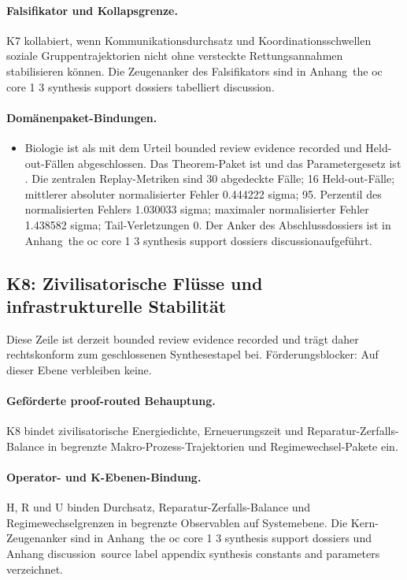 \paragraph{Falsifikator und Kollapsgrenze.}
K7 kollabiert, wenn Kommunikationsdurchsatz und Koordinationsschwellen soziale Gruppentrajektorien nicht ohne versteckte Rettungsannahmen stabilisieren können.
Die Zeugenanker des Falsifikators sind in Anhang~the oc core 1 3 synthesis support dossiers tabelliert discussion.

\paragraph{Domänenpaket-Bindungen.}
\begin{itemize}[leftmargin=1.6em,nosep]
\item Biologie ist als  mit dem Urteil bounded review evidence recorded und  Held-out-Fällen abgeschlossen. Das Theorem-Paket ist  und das Parametergesetz ist . Die zentralen Replay-Metriken sind 30 abgedeckte Fälle; 16 Held-out-Fälle; mittlerer absoluter normalisierter Fehler 0.444222 sigma; 95. Perzentil des normalisierten Fehlers 1.030033 sigma; maximaler normalisierter Fehler 1.438582 sigma; Tail-Verletzungen 0. Der Anker des Abschlussdossiers ist in Anhang~the oc core 1 3 synthesis support dossiers discussionaufgeführt.
\end{itemize}

\subsection{K8: Zivilisatorische Flüsse und infrastrukturelle Stabilität}
\label{sec:oc-core-1-3-synthesis-k8}
Diese Zeile ist derzeit bounded review evidence recorded und trägt daher rechtskonform zum geschlossenen Synthesestapel bei.
Förderungsblocker: Auf dieser Ebene verbleiben keine.

\paragraph{Geförderte proof-routed Behauptung.}
K8 bindet zivilisatorische Energiedichte, Erneuerungszeit und Reparatur-Zerfalls-Balance in begrenzte Makro-Prozess-Trajektorien und Regimewechsel-Pakete ein.

\paragraph{Operator- und K-Ebenen-Bindung.}
H, R und U binden Durchsatz, Reparatur-Zerfalls-Balance und Regimewechselgrenzen in begrenzte Observablen auf Systemebene.
Die Kern-Zeugenanker sind in Anhang~the oc core 1 3 synthesis support dossiers und Anhang discussion~source label appendix synthesis constants and parameters verzeichnet.

